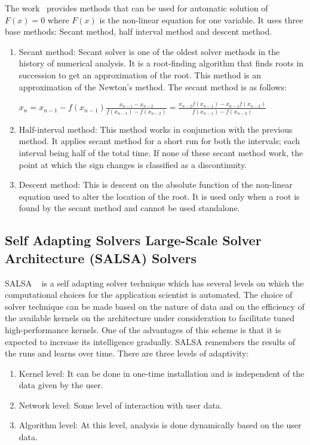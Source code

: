 The work~\cite{poly1} provides methods that can be used for automatic solution of $F(x) = 0 $ where $F(x)$ is the non-linear equation for one variable. It uses three base methods: Secant method, half interval method and descent method.
\begin{enumerate}
\item Secant method: Secant solver is one of the oldest solver methods in the history of numerical analysis. It is a root-finding algorithm that finds roots in succession to get an approximation of the root. This method is an approximation of the Newton's method. The secant method is as follows: 

$x_{n}=x_{n-1}-f(x_{n-1}){\frac {x_{n-1}-x_{n-2}}{f(x_{n-1})-f(x_{n-2})}}={\frac {x_{n-2}f(x_{n-1})-x_{n-1}f(x_{n-2})}{f(x_{n-1})-f(x_{n-2})}}$

\item Half-interval method: This method works in conjunction with the previous method. It applies secant method for a short run for both the intervals; each interval being half of the total time. If none of these secant method work, the point at which the sign changes is classified as a discontinuity. 
\item Descent method: This is descent on the absolute function of the non-linear equation used to alter the location of the root. It is used only when a root is found by the secant method and cannot be used standalone.

\end{enumerate}
\subsection{ Self Adapting Solvers Large-Scale Solver Architecture (SALSA) Solvers}
SALSA ~\cite{salsa} is a self adapting solver technique which has several levels on which the computational choices for the application scientist is automated. The choice of solver technique can be made based on the nature of data and on the efficiency of the available kernels on the architecture under consideration to facilitate tuned high-performance kernels. One of the advantages of this scheme is that it is expected to increase its intelligence gradually. SALSA remembers the results of the runs and learns over time. There are three levels of adaptivity: 
\begin{enumerate}
\item Kernel level: It can be done in one-time installation and is independent of the data given by the user.

\item Network level: Some level of interaction with user data.

\item Algorithm level: At this level, analysis is done dynamically based on the user data.
\end{enumerate}

